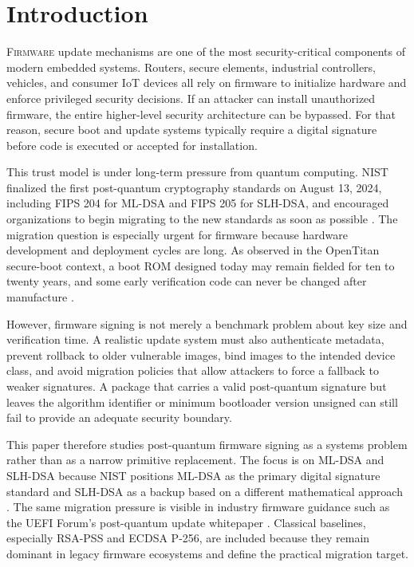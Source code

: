 \section{Introduction}

\lettrine[lines=3,lhang=0.08,loversize=0.15,findent=0.5em,nindent=0em]{F}{irmware} update mechanisms are one of the most security-critical components of modern embedded systems. Routers, secure elements, industrial controllers, vehicles, and consumer IoT devices all rely on firmware to initialize hardware and enforce privileged security decisions. If an attacker can install unauthorized firmware, the entire higher-level security architecture can be bypassed. For that reason, secure boot and update systems typically require a digital signature before code is executed or accepted for installation.

This trust model is under long-term pressure from quantum computing. NIST finalized the first post-quantum cryptography standards on August 13, 2024, including FIPS 204 for ML-DSA and FIPS 205 for SLH-DSA, and encouraged organizations to begin migrating to the new standards as soon as possible \cite{nist_pqc_release,fips204,fips205}. The migration question is especially urgent for firmware because hardware development and deployment cycles are long. As observed in the OpenTitan secure-boot context, a boot ROM designed today may remain fielded for ten to twenty years, and some early verification code can never be changed after manufacture \cite{opentitan_secure_boot,zerorisc_opentitan}.

However, firmware signing is not merely a benchmark problem about key size and verification time. A realistic update system must also authenticate metadata, prevent rollback to older vulnerable images, bind images to the intended device class, and avoid migration policies that allow attackers to force a fallback to weaker signatures. A package that carries a valid post-quantum signature but leaves the algorithm identifier or minimum bootloader version unsigned can still fail to provide an adequate security boundary.

This paper therefore studies post-quantum firmware signing as a systems problem rather than as a narrow primitive replacement. The focus is on ML-DSA and SLH-DSA because NIST positions ML-DSA as the primary digital signature standard and SLH-DSA as a backup based on a different mathematical approach \cite{nist_pqc_release}. The same migration pressure is visible in industry firmware guidance such as the UEFI Forum's post-quantum update whitepaper \cite{uefi_pqc_whitepaper}. Classical baselines, especially RSA-PSS and ECDSA P-256, are included because they remain dominant in legacy firmware ecosystems and define the practical migration target.

